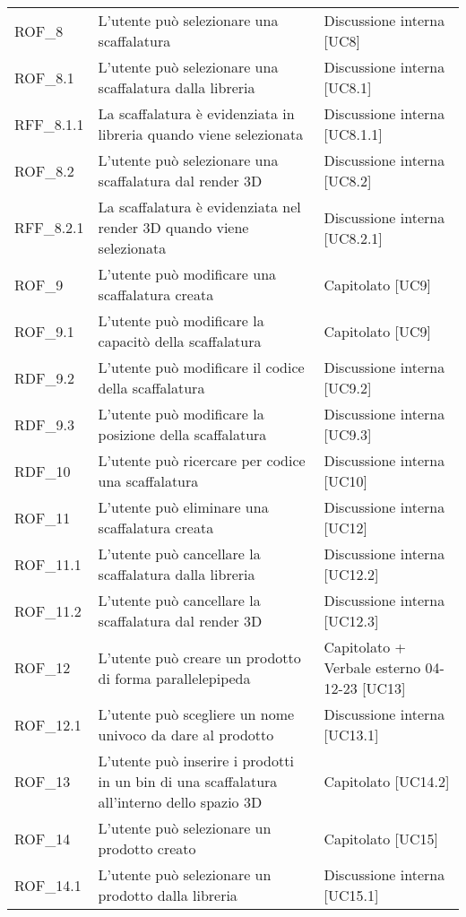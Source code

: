 \begin{xltabular}{\textwidth}{ p{0.2\textwidth} | X | p{0.2\textwidth} }
    ROF\_8& L'utente può selezionare una scaffalatura & Discussione interna [UC8]\\
    ROF\_8.1& L'utente può selezionare una scaffalatura dalla libreria & Discussione interna [UC8.1]\\
    RFF\_8.1.1& La scaffalatura è evidenziata in libreria quando viene selezionata & Discussione interna [UC8.1.1]\\
    ROF\_8.2& L'utente può selezionare una scaffalatura dal render 3D & Discussione interna [UC8.2]\\
    RFF\_8.2.1& La scaffalatura è evidenziata nel render 3D quando viene selezionata & Discussione interna [UC8.2.1]\\
    ROF\_9& L'utente può modificare una scaffalatura creata & Capitolato [UC9]\\
    ROF\_9.1& L'utente può modificare la capacitò della scaffalatura & Capitolato [UC9]\\
    RDF\_9.2& L'utente può modificare il codice della scaffalatura & Discussione interna [UC9.2]\\
    RDF\_9.3& L'utente può modificare la posizione della scaffalatura & Discussione interna [UC9.3]\\
    RDF\_10& L'utente può ricercare per codice una scaffalatura & Discussione interna [UC10]\\
    ROF\_11& L'utente può eliminare una scaffalatura creata & Discussione interna [UC12]\\
    ROF\_11.1& L'utente può cancellare la scaffalatura dalla libreria & Discussione interna [UC12.2]\\
    ROF\_11.2& L'utente può cancellare la scaffalatura dal render 3D & Discussione interna [UC12.3]\\
    ROF\_12& L'utente può creare un prodotto di forma parallelepipeda & Capitolato + Verbale esterno 04-12-23 [UC13]\\
    ROF\_12.1& L'utente può scegliere un nome univoco da dare al prodotto & Discussione interna [UC13.1]\\
    ROF\_13& L'utente può inserire i prodotti in un bin di una scaffalatura all'interno dello spazio 3D & Capitolato [UC14.2]\\
    ROF\_14& L'utente può selezionare un prodotto creato & Capitolato [UC15]\\
    ROF\_14.1& L'utente può selezionare un prodotto dalla libreria & Discussione interna [UC15.1]\\

\end{xltabular}
